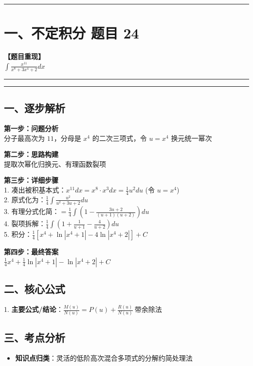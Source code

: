 ﻿\documentclass[12pt, a4paper]{ctexart}
\newcommand{\TopSeparator}{
    \par\noindent\rule{\textwidth}{1.5pt}\vspace{0.5em}
}
\newcommand{\AnalysisSeparator}{
    \par\noindent\rule{\textwidth}{0.5pt}\vspace{0.2em}\hrule\vspace{0.5em}
}
\newenvironment{RedAnalysis}{
    \par
    \color{red} 
}{
    \par
    \color{black} 
}
\begin{document}
\vspace{2em}

\TopSeparator
\section*{一、不定积分 题目 24}

\textbf{【题目重现】} \\
$\int \frac{x^{11}}{x^8+3x^4+2} dx$

\AnalysisSeparator

\begin{RedAnalysis}

	\subsection*{一、逐步解析}

	\textbf{第一步：问题分析} \\
	分子最高次为 $11$，分母是 $x^4$ 的二次三项式，令 $u=x^4$ 换元统一幂次

	\textbf{第二步：思路构建} \\
	提取次幂化归换元、有理函数裂项

	\textbf{第三步：详细步骤} \\
	1. 凑出被积基本式：$x^{11}dx = x^8 \cdot x^3 dx = \frac{1}{4} u^2 du$ (令 $u=x^4$) \\ 
	2. 原式化为：$\frac{1}{4} \int \frac{u^2}{u^2+3u+2} du$ \\ 
	3. 有理分式化简：$ = \frac{1}{4} \int (1 - \frac{3u+2}{(u+1)(u+2)}) du$ \\ 
	4. 裂项拆解：$\frac{1}{4} \int (1 + \frac{1}{u+1} - \frac{4}{u+2}) du$ \\ 
	5. 积分：$\frac{1}{4} [ x^4 + \ln|x^4+1| - 4\ln|x^4+2| ] + C$

	\textbf{第四步：最终答案} \\
	$\frac{1}{4} x^4 + \frac{1}{4} \ln|x^4+1| - \ln|x^4+2| + C$

	\subsection*{二、核心公式}
	1. \textbf{主要公式/结论}：$\frac{M(u)}{N(u)} = P(u) + \frac{R(u)}{N(u)} \ \text{带余除法}$

	\subsection*{三、考点分析}
	\begin{itemize}
		\item \textbf{知识点归类}：灵活的低阶高次混合多项式的分解约简处理法
	\end{itemize}

\end{RedAnalysis}
\end{document}
